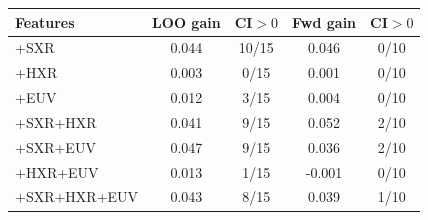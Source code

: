 \begin{tabular}{lcccc}
\toprule
Features & LOO gain & CI$>0$ & Fwd gain & CI$>0$ \\
\midrule
+SXR & 0.044 & 10/15 & 0.046 & 0/10 \\
+HXR & 0.003 &  0/15 & 0.001 & 0/10 \\
+EUV & 0.012 &  3/15 & 0.004 & 0/10 \\
+SXR+HXR & 0.041 &  9/15 & 0.052 & 2/10 \\
+SXR+EUV & 0.047 &  9/15 & 0.036 & 2/10 \\
+HXR+EUV & 0.013 &  1/15 & -0.001 & 0/10 \\
+SXR+HXR+EUV & 0.043 &  8/15 & 0.039 & 1/10 \\
\bottomrule
\end{tabular}
